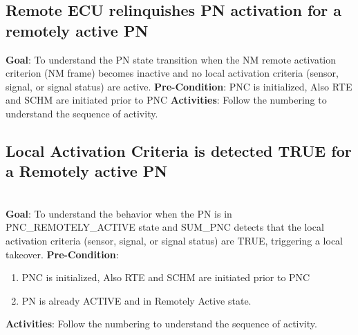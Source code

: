 
{    }

\subsection{Remote ECU relinquishes PN activation for a remotely active PN}
\textbf{Goal}: To understand the PN state transition when the NM remote activation criterion (NM frame) becomes inactive and no local activation criteria (sensor, signal, or signal status) are active.\newline
\textbf{Pre-Condition}: PNC is initialized, Also RTE and SCHM are initiated prior to PNC\newline
\textbf{Activities}: Follow the numbering to understand the sequence of activity.


\subsection{Local Activation Criteria is detected TRUE for a Remotely active PN}
\\
\textbf{Goal}: To understand the behavior when the PN is in PNC\_REMOTELY\_ACTIVE state and SUM\_PNC detects that the local activation criteria (sensor, signal, or signal status) are TRUE, triggering a local takeover.\newline
\textbf{Pre-Condition}:
\begin{enumerate}
\item PNC is initialized, Also RTE and SCHM are initiated prior to PNC
\item PN is already ACTIVE and in Remotely Active state.
\end{enumerate}
\textbf{Activities}: Follow the numbering to understand the sequence of activity.




